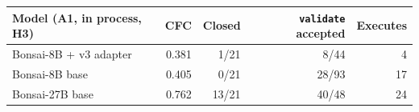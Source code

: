 \begin{tabular}{lrrrr}
\toprule
Model (A1, in process, H3) & CFC & Closed & \texttt{validate} accepted & Executes \\
\midrule
Bonsai-8B + v3 adapter & 0.381 & 1/21 & 8/44 & 4 \\
Bonsai-8B base & 0.405 & 0/21 & 28/93 & 17 \\
Bonsai-27B base & 0.762 & 13/21 & 40/48 & 24 \\
\bottomrule
\end{tabular}
